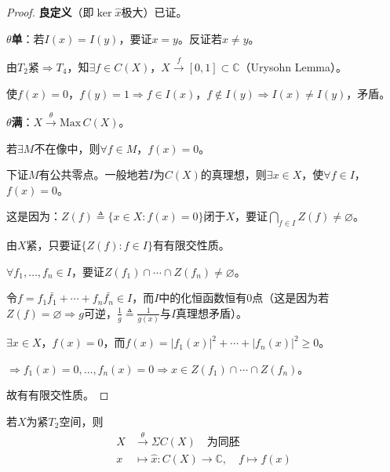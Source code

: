 \documentclass[lang=cn,a4paper,newtx,section]{elegantbook}
\begin{document}
\begin{proof}
  \textbf{良定义}（即$\ker\hat{x}$极大）已证。
  
  \textbf{$\theta$单}：若$I(x) = I(y)$，要证$x = y$。反证若$x \neq y$。
  
  由$T_2$紧$\Rightarrow T_4$，知$\exists f \in C(X)$，$X \xrightarrow{f} [0, 1] \subset \mathbb{C}$（Urysohn Lemma）。
  
  使$f(x) = 0$，$f(y) = 1 \Rightarrow f \in I(x)$，$f \notin I(y) \Rightarrow I(x) \neq I(y)$，矛盾。
  
  \textbf{$\theta$满}：$X \xrightarrow{\theta} \mathrm{Max}\, C(X)$。
  
  若$\exists M$不在像中，则$\forall f \in M$，$f(x) = 0$。
  
  下证$M$有公共零点。一般地若$I$为$C(X)$的真理想，则$\exists x \in X$，使$\forall f \in I$，$f(x) = 0$。
  
  这是因为：$Z(f) \triangleq \{x \in X : f(x) = 0\}$闭于$X$，要证$\bigcap_{f \in I} Z(f) \neq \varnothing$。
  
  由$X$紧，只要证$\{Z(f) : f \in I\}$有有限交性质。
  
  $\forall f_1, \ldots, f_n \in I$，要证$Z(f_1) \cap \cdots \cap Z(f_n) \neq \varnothing$。
  
  令$f = f_1\bar{f_1} + \cdots + f_n\bar{f_n} \in I$，而$I$中的化恒函数恒有$0$点（这是因为若$Z(f) = \varnothing \Rightarrow g$可逆，$\frac{1}{g} \triangleq \frac{1}{g(x)}$与$I$真理想矛盾）。
  
  $\exists x \in X$，$f(x) = 0$，而$f(x) = |f_1(x)|^2 + \cdots + |f_n(x)|^2 \geq 0$。
  
  $\Rightarrow f_1(x) = 0, \ldots, f_n(x) = 0 \Rightarrow x \in Z(f_1) \cap \cdots \cap Z(f_n)$。
  
  故有有限交性质。
\end{proof}

\begin{theorem}
  若$X$为紧$T_2$空间，则
  \begin{equation*}
    \begin{aligned}
      X &\xrightarrow{\theta} \Sigma C(X) \quad \text{为同胚} \\
      x &\longmapsto \hat{x}: C(X) \to \mathbb{C}, \quad f \mapsto f(x)
    \end{aligned}
  \end{equation*}
\end{theorem}
\end{document}
